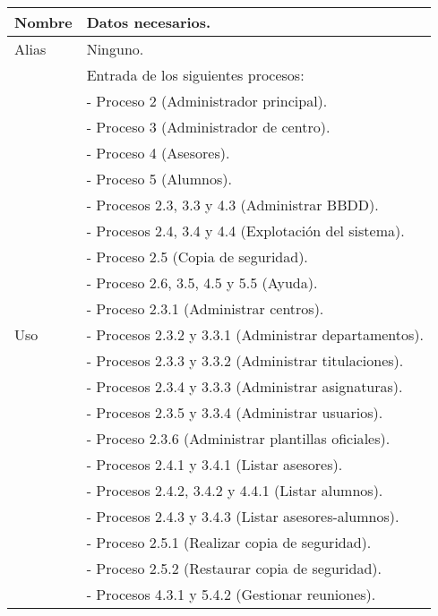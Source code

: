 \begin{center}
  \begin{longtable}{| l | p{9cm} |}
    \hline
    Nombre & \textbf{Datos necesarios}.\\
    \hline
    Alias & Ninguno.\\
    \hline
    \multirow{54}{*}{Uso} & Entrada de los siguientes procesos:\\
                         & - Proceso 2 (Administrador principal).\\
                         & - Proceso 3 (Administrador de centro).\\
                         & - Proceso 4 (Asesores).\\
                         & - Proceso 5 (Alumnos).\\
                         & - Procesos 2.3, 3.3 y 4.3 (Administrar BBDD).\\
                         & - Procesos 2.4, 3.4 y 4.4 (Explotación del sistema).\\
                         & - Proceso 2.5 (Copia de seguridad).\\
                         & - Proceso 2.6, 3.5, 4.5 y 5.5 (Ayuda).\\
                         & - Proceso 2.3.1 (Administrar centros).\\
                         & - Procesos 2.3.2 y 3.3.1 (Administrar departamentos).\\
                         & - Procesos 2.3.3 y 3.3.2 (Administrar titulaciones).\\
                         & - Procesos 2.3.4 y 3.3.3 (Administrar asignaturas).\\
                         & - Procesos 2.3.5 y 3.3.4 (Administrar usuarios).\\
                         & - Proceso 2.3.6 (Administrar plantillas oficiales).\\
                         & - Procesos 2.4.1 y 3.4.1 (Listar asesores).\\
                         & - Procesos 2.4.2, 3.4.2 y 4.4.1 (Listar alumnos).\\
                         & - Procesos 2.4.3 y 3.4.3 (Listar asesores-alumnos).\\
                         & - Proceso 2.5.1 (Realizar copia de seguridad).\\
                         & - Proceso 2.5.2 (Restaurar copia de seguridad).\\
                         & - Procesos 4.3.1 y 5.4.2 (Gestionar reuniones).\\

\end{longtable}
\end{center}
